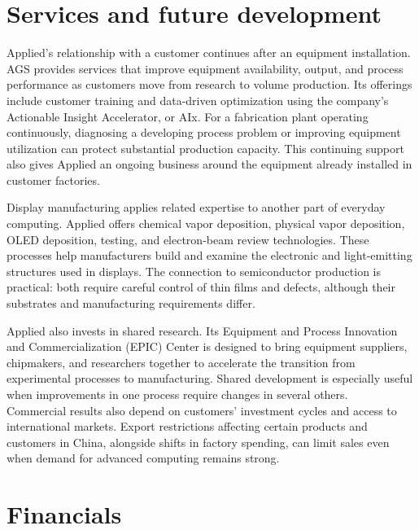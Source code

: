 \documentclass[10pt]{article}
\begin{document}
\section*{Services and future development}

Applied's relationship with a customer continues after an equipment installation. AGS provides services that improve equipment availability, output, and process performance as customers move from research to volume production. Its offerings include customer training and data-driven optimization using the company's Actionable Insight Accelerator, or AIx. For a fabrication plant operating continuously, diagnosing a developing process problem or improving equipment utilization can protect substantial production capacity. This continuing support also gives Applied an ongoing business around the equipment already installed in customer factories.~\cite{amat-services}

Display manufacturing applies related expertise to another part of everyday computing. Applied offers chemical vapor deposition, physical vapor deposition, OLED deposition, testing, and electron-beam review technologies. These processes help manufacturers build and examine the electronic and light-emitting structures used in displays. The connection to semiconductor production is practical: both require careful control of thin films and defects, although their substrates and manufacturing requirements differ.~\cite{amat-display}

Applied also invests in shared research. Its Equipment and Process Innovation and Commercialization (EPIC) Center is designed to bring equipment suppliers, chipmakers, and researchers together to accelerate the transition from experimental processes to manufacturing. Shared development is especially useful when improvements in one process require changes in several others.~\cite{amat-epic} Commercial results also depend on customers' investment cycles and access to international markets. Export restrictions affecting certain products and customers in China, alongside shifts in factory spending, can limit sales even when demand for advanced computing remains strong.~\cite{amat-annual}

\newpage
\section*{Financials}
\end{document}
